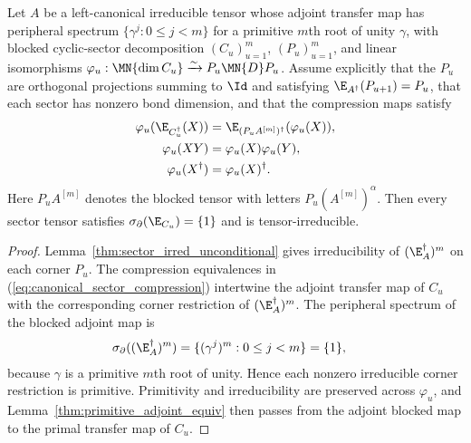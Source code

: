 \begin{lemma}%
    \label{thm:blocked_sector_unconditional}
    \leanok
    Let $A$ be a left-canonical irreducible tensor whose adjoint transfer map has
    peripheral spectrum
    $\{\gamma^j:0\le j<m\}$ for a primitive $m$th root of unity $\gamma$,
    with blocked cyclic-sector decomposition $(C_u)_{u=1}^m$,
    $(P_u)_{u=1}^m$, and linear isomorphisms
    $\varphi_u:\MN{\dim C_u}\xrightarrow{\sim}P_u\MN{D}P_u$. Assume
    explicitly that the $P_u$ are orthogonal projections summing to $\Id$ and
    satisfying $\E_{A^\dagger}(P_{u+1})=P_u$, that each sector has nonzero bond
    dimension, and that the compression maps satisfy
    \begin{align}
        \varphi_u(\E_{C_u^\dagger}(X))
         & =
        \E_{(P_uA^{[m]})^\dagger}(\varphi_u(X)),
        \notag \\
        \varphi_u(XY)
         & =
        \varphi_u(X)\varphi_u(Y),
        \notag \\
        \varphi_u(X^\dagger)
         & =
        \varphi_u(X)^\dagger.
        \label{eq:canonical_sector_compression}
    \end{align}
    Here $P_uA^{[m]}$ denotes the blocked tensor with letters
    $P_u(A^{[m]})^\alpha$.
    Then every sector tensor satisfies
    $\sigma_\partial(\E_{C_u})=\{1\}$ and is tensor-irreducible.
\end{lemma}

\begin{proof}\leanok
    Lemma~\ref{thm:sector_irred_unconditional} gives irreducibility of
    $(\E_A^\dagger)^m$ on each corner $P_u$. The compression equivalences
    in (\ref{eq:canonical_sector_compression}) intertwine the adjoint transfer
    map of $C_u$ with the corresponding corner restriction of
    $(\E_A^\dagger)^m$. The peripheral spectrum of the blocked adjoint map is
    \begin{align}
        \sigma_\partial((\E_A^\dagger)^m)
         & =
        \{(\gamma^j)^m:0\le j<m\}
        =
        \{1\},
        \label{eq:canonical_blocked_peripheral}
    \end{align}
    because $\gamma$ is a primitive $m$th root of unity. Hence each nonzero
    irreducible corner restriction is primitive. Primitivity and irreducibility
    are preserved across $\varphi_u$, and
    Lemma~\ref{thm:primitive_adjoint_equiv} then passes from the adjoint blocked
    map to the primal transfer map of $C_u$.
\end{proof}

